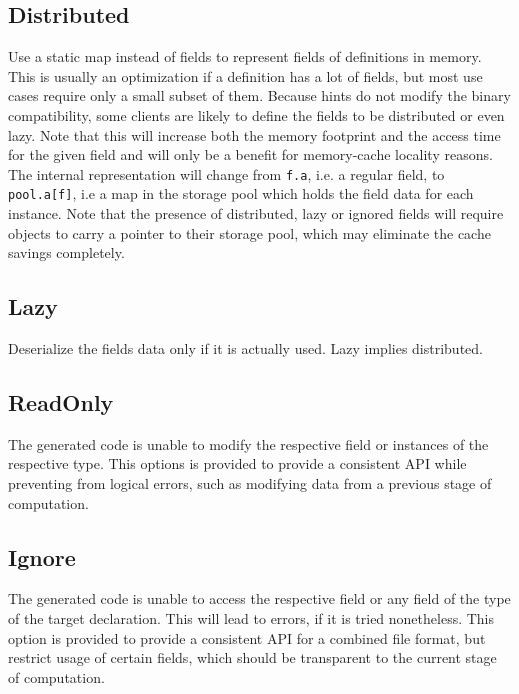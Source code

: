 \subsection*{Distributed}
Use a static map instead of fields to represent fields of definitions in memory. This is usually an optimization if a definition has a lot of fields, but most use cases require only a small subset of them. Because hints do not modify the binary compatibility, some clients are likely to define the fields to be distributed or even lazy. Note that this will increase both the memory footprint and the access time for the given field and will only be a benefit for memory-cache locality reasons. The internal representation will change from \texttt{f.a}, i.e. a regular field, to \texttt{pool.a[f]}, i.e a map in the storage pool which holds the field data for each instance. Note that the presence of distributed, lazy or ignored fields will require objects to carry a pointer to their storage pool, which may eliminate the cache savings completely.

\subsection*{Lazy}
Deserialize the fields data only if it is actually used. Lazy implies distributed.

\subsection*{ReadOnly}
The generated code is unable to modify the respective field or instances of the respective type. This options is provided to provide a consistent API while preventing from logical errors, such as modifying data from a previous stage of computation.

\subsection*{Ignore}
The generated code is unable to access the respective field or any field of the type of the target declaration. This will lead to errors, if it is tried nonetheless. This option is provided to provide a consistent API for a combined file format, but restrict usage of certain fields, which should be transparent to the current stage of computation.

